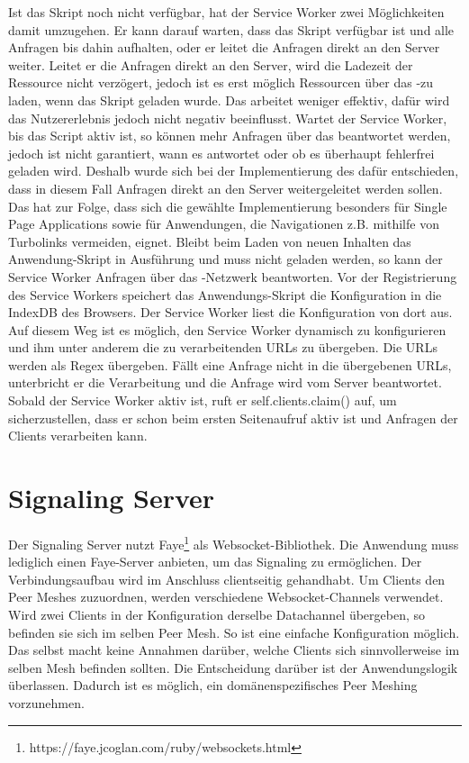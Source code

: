 \begin{description}
Ist das Skript noch nicht verfügbar, hat der Service Worker zwei Möglichkeiten damit umzugehen. Er kann darauf warten, dass das Skript verfügbar ist und alle Anfragen bis dahin aufhalten, oder er leitet die Anfragen direkt an den Server weiter. Leitet er die Anfragen direkt an den Server, wird die Ladezeit der Ressource nicht verzögert, jedoch ist es erst möglich Ressourcen über das \pTp-\cdn zu laden, wenn das Skript geladen wurde. Das \cdn arbeitet weniger effektiv, dafür wird das Nutzererlebnis jedoch nicht negativ beeinflusst. Wartet der Service Worker, bis das Script aktiv ist, so können mehr Anfragen über das \cdn beantwortet werden, jedoch ist nicht garantiert, wann es antwortet oder ob es überhaupt fehlerfrei geladen wird. Deshalb wurde sich bei der Implementierung des \cdn dafür entschieden, dass in diesem Fall Anfragen direkt an den Server weitergeleitet werden sollen. Das hat zur Folge, dass sich die gewählte Implementierung besonders für Single Page Applications sowie für Anwendungen, die Navigationen z.B. mithilfe von Turbolinks vermeiden, eignet. Bleibt beim Laden von neuen Inhalten das Anwendung-Skript in Ausführung und muss nicht geladen werden, so kann der Service Worker Anfragen über das \pTp-Netzwerk beantworten.
 Vor der Registrierung des Service Workers speichert das Anwendungs-Skript die Konfiguration in die IndexDB des Browsers. Der Service Worker liest die Konfiguration von dort aus. Auf diesem Weg ist es möglich, den Service Worker dynamisch zu konfigurieren und ihm unter anderem die zu verarbeitenden URLs zu übergeben. Die URLs werden als Regex übergeben. Fällt eine Anfrage nicht in die übergebenen URLs, unterbricht er die Verarbeitung und die Anfrage wird vom Server beantwortet.
 Sobald der Service Worker aktiv ist, ruft er self.clients.claim() auf, um sicherzustellen, dass er schon beim ersten Seitenaufruf aktiv ist und Anfragen der Clients verarbeiten kann.
 
\section{Signaling Server}\label{i:signaling}
Der Signaling Server nutzt Faye\footnote{https://faye.jcoglan.com/ruby/websockets.html} als Websocket-Bibliothek. Die Anwendung muss lediglich einen Faye-Server anbieten, um das Signaling zu ermöglichen. Der Verbindungsaufbau wird im Anschluss clientseitig gehandhabt. 
Um Clients den Peer Meshes zuzuordnen, werden verschiedene Websocket-Channels verwendet. Wird zwei Clients in der Konfiguration derselbe Datachannel übergeben, so befinden sie sich im selben Peer Mesh. So ist eine einfache Konfiguration möglich. Das \cdn selbst macht keine Annahmen darüber, welche Clients sich sinnvollerweise im selben Mesh befinden sollten. Die Entscheidung darüber ist der Anwendungslogik überlassen. Dadurch ist es möglich, ein domänenspezifisches Peer Meshing vorzunehmen.


\end{description}
